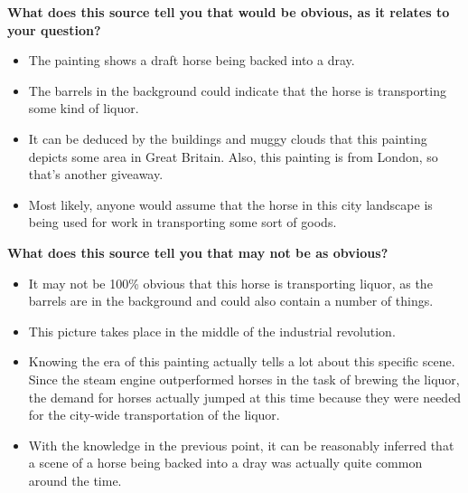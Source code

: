 

\textbf{What does this source tell you that would be obvious, as it relates to your question?}
\begin{itemize}
    \item The painting shows a draft horse being backed into a dray.
    \item The barrels in the background could indicate that the horse is transporting some kind of liquor.
    \item It can be deduced by the buildings and muggy clouds that this painting depicts some area in Great Britain.  Also, this painting is from London, so that's another giveaway.
    \item Most likely, anyone would assume that the horse in this city landscape is being used for work in transporting some sort of goods. \\
\end{itemize}

\textbf{What does this source tell you that may not be as obvious?}
\begin{itemize}
    \item It may not be 100\% obvious that this horse is transporting liquor, as the barrels are in the background and could also contain a number of things.
    \item This picture takes place in the middle of the industrial revolution.
    \item Knowing the era of this painting actually tells a lot about this specific scene.  Since the steam engine outperformed horses in the task of brewing the liquor, the demand for horses actually jumped at this time because they were needed for the city-wide transportation of the liquor.
    \item With the knowledge in the previous point, it can be reasonably inferred that a scene of a horse being backed into a dray was actually quite common around the time.
\end{itemize}